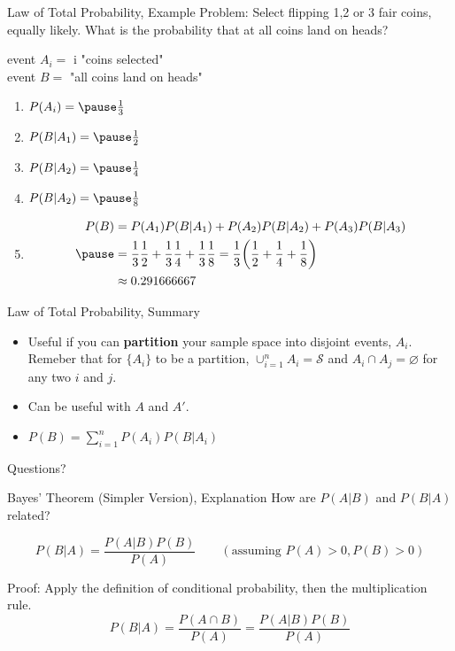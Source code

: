 \documentclass[handout]{beamer}
\newcommand{\qtns}[0]{\begin{center} Questions? \end{center}}
\newcommand{\nl}[1]{\vspace{#1 em}}
\let\emptyset\varnothing
\begin{document}
    \begin{frame}{Law of Total Probability, Example}
        Problem: Select flipping 1,2 or 3 fair coins, equally likely. What is the probability that at all coins land on heads?
        \pause \begin{center}
            event $A_i =$ i "coins selected"\\ \nl{0.5}
            event $B =$ "all coins land on heads"
        \end{center}
        \begin{enumerate}
            \pause \item $P(A_i) = \pause \frac{1}{3}$
            \pause \item $P(B|A_1) = \pause \frac{1}{2}$
            \pause \item $P(B|A_2) = \pause \frac{1}{4}$
            \pause \item $P(B|A_2) = \pause \frac{1}{8}$
            \pause \item \begin{align*}
                P(B) &= P(A_1)P(B|A_1)+P(A_2)P(B|A_2)+P(A_3)P(B|A_3) \\
                 \pause &= \frac{1}{3}\frac{1}{2} + \frac{1}{3}\frac{1}{4} + \frac{1}{3}\frac{1}{8} = \frac{1}{3}\bigg(\frac{1}{2} + \frac{1}{4} + \frac{1}{8}\bigg)\\
                 & \approx 0.291666667
            \end{align*}
        \end{enumerate}
    \end{frame}

    \begin{frame}{Law of Total Probability, Summary}
        \begin{itemize}
            \item Useful if you can \textbf{partition} your sample space into disjoint events, $A_i$. Remeber that for $\{A_i\}$ to be a partition, $\cup_{i=1}^n A_i = \mathcal{S}$ and $A_i \cap A_j = \emptyset$ for any two $i$ and $j$.
            \item Can be useful with $A$ and $A'$.
            \item $P(B)=\sum_{i=1}^n P(A_i)P(B|A_i)$
        \end{itemize}
        \qtns
    \end{frame}

    \begin{frame}{Bayes' Theorem (Simpler Version), Explanation}
        How are $P(A|B)$ and $P(B|A)$ related?
        \pause\begin{block}{}
        \vspace{-.2cm}$$P(B|A) = \frac{P(A|B)P(B)}{P(A)} \quad\quad (\text{assuming $P(A)>0, P(B)>0$})$$
        \end{block}
        \pause Proof: Apply the definition of conditional probability, then the multiplication rule.
        $$P(B|A) = \frac{P(A \cap B)}{P(A)} = \frac{P(A|B)P(B)}{P(A)}$$
        \end{frame}
\end{document}
